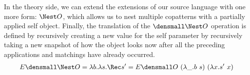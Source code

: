 In the theory side, we can extend the extensions of our source language with one more form: $\Nest O$, which allows us to nest multiple copatterns with a partially applied self object. 
Finally, the translation of the $\den{\Nest O}$ operation is defined by recursively creating a new value for the self parameter by recursively taking a new snapshot of how the object looks now after all the preceding applications and matchings have already occurred.
\begin{align*}
  E\den{\Nest O}
  &=
  \lambda b. \lambda s. \Rec s' = E\den{O} ~ (\lambda \_. b ~ s) ~ (\lambda x. s' ~ x)
  \\
\end{align*}
